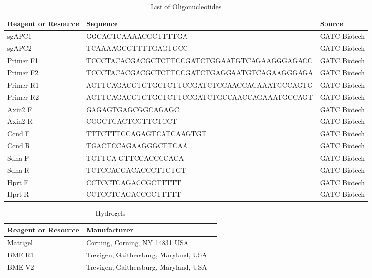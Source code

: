 \begin{flushleft}
\begin{table}[htb]
\caption{List of Oligonucleotides}
\label{tab:oligonucleotides} %
\begin{tabularx}{\textwidth}{XlX}
\toprule
\textbf{Reagent or Resource} & \textbf{Sequence} & \textbf{Source} \\
\midrule
sgAPC1 & GGCACTCAAAACGCTTTTGA & GATC Biotech \\
sgAPC2 & TCAAAAGCGTTTTGAGTGCC & GATC Biotech \\
Primer F1 & TCCCTACACGACGCTCTTCCGATCTGGAATGTCAGAAGGGAGACC & GATC Biotech \\
Primer F2 & TCCCTACACGACGCTCTTCCGATCTGAGGAATGTCAGAAGGGAGA & GATC Biotech \\
Primer R1 & AGTTCAGACGTGTGCTCTTCCGATCTCCAACCAGAAATGCCAGTG & GATC Biotech \\
Primer R2 & AGTTCAGACGTGTGCTCTTCCGATCTGCCAACCAGAAATGCCAGT & GATC Biotech \\
Axin2 F & GAGAGTGAGCGGCAGAGC & GATC Biotech \\
Axin2 R & CGGCTGACTCGTTCTCCT & GATC Biotech \\
Ccnd F & TTTCTTTCCAGAGTCATCAAGTGT & GATC Biotech \\
Ccnd R & TGACTCCAGAAGGGCTTCAA & GATC Biotech \\
Sdha F & TGTTCA GTTCCACCCCACA & GATC Biotech \\
Sdha R & TCTCCACGACACCCTTCTGT & GATC Biotech \\
Hprt F & CCTCCTCAGACCGCTTTTT & GATC Biotech \\
Hprt R & CCTCCTCAGACCGCTTTTT & GATC Biotech \\
\bottomrule
\end{tabularx}
\end{table}

\begin{table}[htb]
\caption{Hydrogels}
\label{tab:hydrogels} %
\begin{tabularx}{\textwidth}{XlX}
\toprule
\textbf{Reagent or Resource} & \textbf{Manufacturer} \\
\midrule
Matrigel & Corning, Corning, NY 14831 USA \\
BME R1 & Trevigen, Gaithersburg, Maryland, USA \\
BME V2 & Trevigen, Gaithersburg, Maryland, USA \\
\bottomrule
\end{tabularx}
\end{table}




\end{flushleft}

